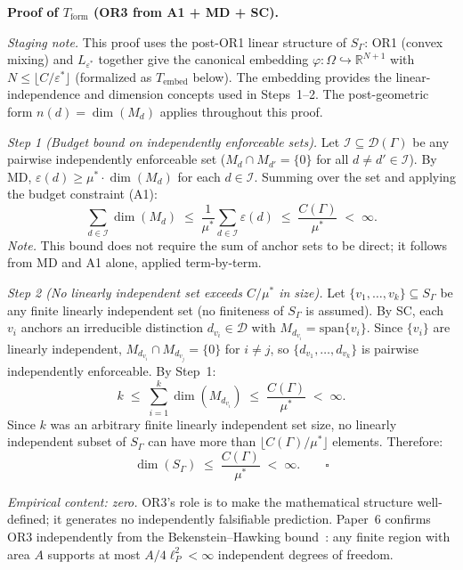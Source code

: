 \documentclass[11pt]{article}
\theoremstyle{remark}
\begin{document}
\smallskip\noindent\textbf{Proof of $T_{\mathrm{form}}$ (OR3 from A1 + MD + SC).}

\noindent\textit{Staging note.}  This proof uses the post-OR1 linear structure of $S_\Gamma$: OR1 (convex mixing) and $L_{\varepsilon^*}$ together give the canonical embedding $\varphi: \Omega \hookrightarrow \mathbb{R}^{N+1}$ with $N \le \lfloor C/\varepsilon^* \rfloor$ (formalized as $T_{\mathrm{embed}}$ below).  The embedding provides the linear-independence and dimension concepts used in Steps~1--2.  The post-geometric form $n(d) = \dim(M_d)$ applies throughout this proof.

\textit{Step 1 (Budget bound on independently enforceable sets).}  Let $\mathcal{I} \subseteq \mathcal{D}(\Gamma)$ be any pairwise independently enforceable set ($M_d \cap M_{d'} = \{0\}$ for all $d \neq d' \in \mathcal{I}$).  By MD, $\varepsilon(d) \ge \mu^* \cdot \dim(M_d)$ for each $d \in \mathcal{I}$.  Summing over the set and applying the budget constraint (A1):
\[
\sum_{d \in \mathcal{I}} \dim(M_d) \;\leq\; \frac{1}{\mu^*}\sum_{d \in \mathcal{I}} \varepsilon(d) \;\leq\; \frac{C(\Gamma)}{\mu^*} \;<\; \infty.
\]
\noindent\textit{Note.}  This bound does not require the sum of anchor sets to be direct; it follows from MD and A1 alone, applied term-by-term.

\textit{Step 2 (No linearly independent set exceeds $C/\mu^*$ in size).}  Let $\{v_1, \ldots, v_k\} \subseteq S_\Gamma$ be any finite linearly independent set (no finiteness of $S_\Gamma$ is assumed).  By SC, each $v_i$ anchors an irreducible distinction $d_{v_i} \in \mathcal{D}$ with $M_{d_{v_i}} = \mathrm{span}\{v_i\}$.  Since $\{v_i\}$ are linearly independent, $M_{d_{v_i}} \cap M_{d_{v_j}} = \{0\}$ for $i \ne j$, so $\{d_{v_1}, \ldots, d_{v_k}\}$ is pairwise independently enforceable.  By Step~1:
\[
k \;\leq\; \sum_{i=1}^k \dim(M_{d_{v_i}}) \;\leq\; \frac{C(\Gamma)}{\mu^*} \;<\; \infty.
\]
Since $k$ was an arbitrary finite linearly independent set size, no linearly independent subset of $S_\Gamma$ can have more than $\lfloor C(\Gamma)/\mu^* \rfloor$ elements.  Therefore:
\[
\dim(S_\Gamma) \;\leq\; \frac{C(\Gamma)}{\mu^*} \;<\; \infty. \qquad \square
\]

\textit{Empirical content: zero.}  OR3's role is to make the mathematical structure well-defined; it generates no independently falsifiable prediction.  Paper~6 confirms OR3 independently from the Bekenstein--Hawking bound~\cite{Bekenstein1981}: any finite region with area $A$ supports at most $A/4\ell_P^2 < \infty$ independent degrees of freedom.
\end{document}
